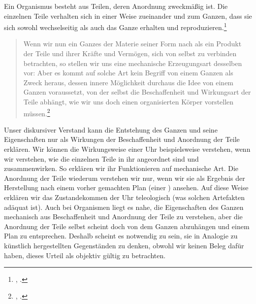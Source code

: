 Ein Organismus besteht aus Teilen, deren Anordnung zweckmäßig
ist. Die einzelnen Teile verhalten sich in einer Weise zueinander und zum
Ganzen, dass sie sich sowohl wechselseitig als auch das Ganze erhalten und
reproduzieren.\footnote{\cite[Vgl.][\S~64]{Kant:KritikderUrteilskraft2009},
\cite[][V: 371.13--372.11]{Kant:GesammelteWerke1900ff.}.}
\begin{quote}
Wenn wir nun ein Ganzes der Materie seiner Form nach als ein Produkt der Teile
und ihrer Kräfte und Vermögen, sich von selbst zu verbinden {\punkt} betrachten,
so stellen wir uns eine mechanische Erzeugungsart desselben vor: Aber es kommt
auf solche Art kein Begriff von einem Ganzen als Zweck heraus, dessen innere
Möglichkeit durchaus die Idee von einem Ganzen voraussetzt, von der selbst die
Beschaffenheit und Wirkungsart der Teile abhängt, wie wir uns doch einen
organisierten Körper vorstellen
müssen.\footnote{\cite[][\S~77]{Kant:KritikderUrteilskraft2009},
\cite[][V: 408.24--31]{Kant:GesammelteWerke1900ff.}.}
\end{quote}
Unser diskursiver Verstand kann die Entstehung des Ganzen und seine
Eigenschaften nur als Wirkungen der Beschaffenheit und Anordnung der Teile
erklären. Wir können die Wirkungsweise einer Uhr beispielsweise verstehen, wenn
wir verstehen, wie die einzelnen Teile in ihr angeordnet sind und
zusammenwirken. So erklären wir ihr Funktionieren auf mechanische Art. Die
Anordnung der Teile wiederum verstehen wir nur, wenn wir sie als Ergebnis der
Herstellung nach einem vorher gemachten Plan (einer ) ansehen.
Auf diese Weise erklären wir das Zustandekommen der Uhr teleologisch (was
solchen Artefakten adäquat ist). Auch bei Organismen liegt es nahe,
die Eigenschaften des Ganzen mechanisch aus Beschaffenheit und Anordnung der
Teile zu verstehen, aber die Anordnung der Teile selbst scheint doch von dem
Ganzen abzuhängen und einem Plan zu entsprechen. Deshalb scheint es notwendig zu
sein, sie in Analogie zu künstlich hergestellten Gegenständen zu denken, obwohl
wir keinen Beleg dafür haben, dieses Urteil als objektiv gültig zu betrachten.

